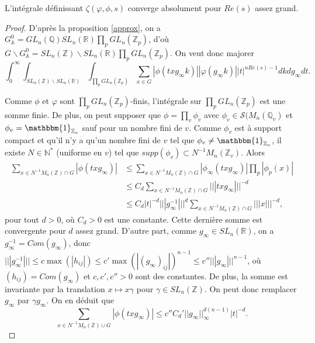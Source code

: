 \begin{lemme}
\label{lemme_convergence_globale}
L'intégrale définissant $\zeta(\varphi, \phi, s)$ converge absolument pour $Re(s)$ assez grand.
\end{lemme}

\begin{proof}
D'après la proposition \ref{approx}, on a $G^0_\mathbb{A} = GL_n(\mathbb{Q})SL_n(\mathbb{R})\prod_p GL_n(\mathbb{Z}_p)$, d'où $G \backslash G^0_\mathbb{A} = SL_n(\mathbb{Z}) \backslash SL_n(\mathbb{R}) \prod_p GL_n(\mathbb{Z}_p)$. On veut donc majorer
\begin{equation}
\label{convergence_globale}
\int_0^\infty \int_{SL_n(\mathbb{Z}) \backslash SL_n(\mathbb{R})} \int_{\prod_p GL_n(\mathbb{Z}_p)} \sum_{x \in G}{|\phi(txg_\infty k)|} |\varphi(g_\infty k)| |t|^{nRe(s)-1} dk dg_\infty dt.
\end{equation}

Comme $\phi$ et $\varphi$ sont $\prod_p GL_n(\mathbb{Z}_p)$-finis, l'intégrale sur $\prod_p GL_n(\mathbb{Z}_p)$ est une somme finie. De plus, on peut supposer que $\phi = \prod_v \phi_v$ avec $\phi_v \in \mathcal{S}(M_n(\mathbb{Q}_v)$ et $\phi_v = \mathbbm{1}_{\mathbb{Z}_v}$ sauf pour un nombre fini de $v$. Comme $\phi_v$ est à support compact et qu'il n'y a qu'un nombre fini de $v$ tel que $\phi_v \neq \mathbbm{1}_{\mathbb{Z}_v}$, il existe $N \in \mathbb{N}^*$ (uniforme en $v$) tel que $supp(\phi_v) \subset N^{-1}M_n(\mathbb{Z}_v)$. Alors
\begin{align}
\sum_{x \in N^{-1}M_n(\mathbb{Z}) \cap G} |\phi(txg_\infty)| &\leq \sum_{x \in N^{-1}M_n(\mathbb{Z}) \cap G} |\phi_\infty(txg_\infty)|\prod_p |\phi_p(x)| \\
&\leq C_d \sum_{x \in N^{-1}M_n(\mathbb{Z}) \cap G} |||txg_\infty|||^{-d} \\
&\leq C_d |t|^{-d}|||g_\infty^{-1}|||^d\sum_{x \in N^{-1}M_n(\mathbb{Z}) \cap G} |||x|||^{-d},
\end{align}
pour tout $d > 0$, où $C_d > 0$ est une constante. Cette dernière somme est convergente pour $d$ assez grand. D'autre part, comme $g_\infty \in SL_n(\mathbb{R})$, on a $g_\infty^{-1} = Com(g_\infty)$, donc $|||g_\infty^{-1}||| \leq c \max(|h_{ij}|) \leq c'\max(|(g_\infty)_{ij}|)^{n-1} \leq c'' |||g_\infty|||^{n-1}$, où $(h_{ij})=Com(g_\infty)$ et $c,c',c'' > 0$ sont des constantes. De plus, la somme est invariante par la translation $x \mapsto x\gamma$ pour $\gamma \in SL_n(\mathbb{Z})$. On peut donc remplacer $g_\infty$ par $\gamma g_\infty$. On en déduit que
\begin{equation}
\sum_{x \in N^{-1}M_n(\mathbb{Z}) \cup G} |\phi(txg_\infty)| \leq c''C_d' ||g_\infty ||^{d(n-1)}_{\infty} |t|^{-d}.
\end{equation}


\end{proof}
